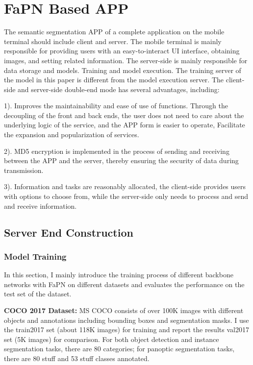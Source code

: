 
\section{FaPN Based APP}
The semantic segmentation APP of a complete application on the mobile terminal should include client and server. 
The mobile terminal is mainly responsible for providing users with an easy-to-interact UI interface, obtaining images, and setting related information. 
The server-side is mainly responsible for data storage and models. Training and model execution. The training server of the model in this paper is different from the model execution server. The client-side and server-side double-end mode has several advantages, including: 

1). Improves the maintainability and ease of use of functions. Through the decoupling of the front and back ends, the user does not need to care about the underlying logic of the service, and the APP form is easier to operate, Facilitate the expansion and popularization of services. 

2). MD5 encryption is implemented in the process of sending and receiving between the APP and the server, thereby ensuring the security of data during transmission. 

3). Information and tasks are reasonably allocated, the client-side provides users with options to choose from, while the server-side only needs to process and send and receive information.

\subsection{Server End Construction}

\subsubsection{Model Training}


In this section, I mainly introduce the training process of different backbone networks with FaPN on different datasets and evaluates the performance on the test set of the dataset.

\textbf{COCO 2017 Dataset: }MS COCO \cite{lin2014microsoft} consists of over 100K images with different objects and annotations including bounding boxes and segmentation masks. I use the train2017 set (about 118K images) for training and report the results val2017 set (5K images) for comparison. For both object detection and instance segmentation tasks, there are 80 categories; for panoptic segmentation tasks, there are 80 stuff and 53 stuff classes annotated.

